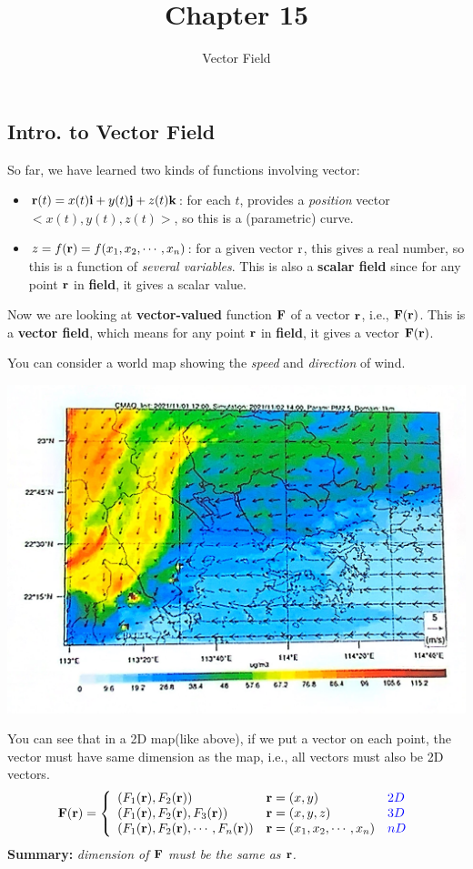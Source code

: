 \documentclass[11pt, a4paper]{MATH2023}
\title{Chapter 15}
\subtitle{Vector Field}
\begin{document}
\begin{spacing}{1.3}

    \section{Intro. to Vector Field}

    So far, we have learned two kinds of functions involving vector: 
    \begin{itemize}
        \item ${\bf r}(t)=x(t){\bf i}+y(t){\bf j}+z(t){\bf k}$: for each $t$, provides a {\it position} vector 
        $<x(t), y(t), z(t)>$, so this is a (parametric) curve.
        \item $z=f({\bf r})=f(x_1,x_2,\cdots,x_n)$: for a given vector ${\rm r}$, this gives a real number,
        so this is a function of {\it several variables}. This is also a {\bf scalar field} since for 
        any point ${\bf r}$ in {\bf field}, it gives a scalar value. 
    \end{itemize}
    Now we are looking at {\bf vector-valued} function ${\bf F}$ of a vector ${\bf r}$, i.e., ${\bf F(r)}$.
    This is a {\bf vector field}, which means for any point ${\bf r}$ in {\bf field}, it gives a vector 
    ${\bf F(r)}$. 

    You can consider a world map showing the {\it speed} and {\it direction} of wind.
    \begin{center}
        \includegraphics[scale=0.17]{images/Ch15-wind.JPG}
    \end{center}

    You can see that in a 2D map(like above), if we put a vector on each point, the vector must have 
    same dimension as the map, i.e., all vectors must also be 2D vectors.
    $${\bf F(r)}=\left\{
        \begin{array}{lll}
            (F_1({\bf r}), F_2({\bf r})) & {\bf r}=(x,y) & {\color{blue} 2D}\\
            (F_1({\bf r}), F_2({\bf r}), F_3({\bf r})) & {\bf r}=(x,y,z) & {\color{blue} 3D}\\
            (F_1({\bf r}), F_2({\bf r}), \cdots, F_n({\bf r})) & {\bf r}=(x_1, x_2,\cdots, x_n) & {\color{blue} nD}
        \end{array}\right.$$
    {\bf Summary:} {\it dimension of ${\bf F}$ must be the same as ${\bf r}$.}


\end{spacing}
\end{document}
